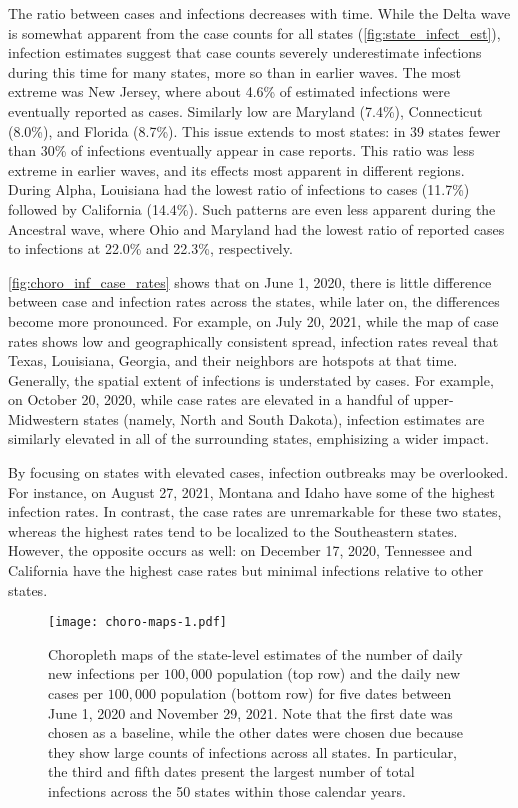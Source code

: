 The ratio between cases and infections decreases with time. While the Delta wave
is somewhat apparent from the case counts for all states
(\autoref{fig:state_infect_est}), infection estimates suggest that case counts
severely underestimate infections during this time for many states, more so than
in earlier waves. The most extreme was New Jersey, where about 4.6\% of
estimated infections were eventually reported as cases. Similarly low are
Maryland (7.4\%), Connecticut (8.0\%), and Florida (8.7\%). This issue extends
to most states: in 39 states fewer than 30\% of infections eventually appear in
case reports. This ratio was less extreme in earlier waves, and its effects most
apparent in different regions. During Alpha, Louisiana had the lowest ratio of
infections to cases (11.7\%) followed by California (14.4\%). Such patterns are
even less apparent during the Ancestral wave, where Ohio and Maryland had the
lowest ratio of reported cases to infections at 22.0\% and 22.3\%,
respectively. 

\autoref{fig:choro_inf_case_rates} shows that on June 1, 2020, there is little
difference between case and infection rates across the states, while later on,
the differences become more pronounced. For example, on July 20, 2021, while the
map of case rates shows low and geographically consistent spread, infection
rates reveal that Texas, Louisiana, Georgia, and their neighbors are hotspots at
that time. Generally, the spatial extent of infections is understated by
cases. For example, on October 20, 2020, while case rates are elevated in a
handful of upper-Midwestern states (namely, North and South Dakota), infection
estimates are similarly elevated in all of the surrounding states, emphisizing a
wider impact.

By focusing on states with elevated cases, infection outbreaks may be
overlooked. For instance, on August 27, 2021, Montana and Idaho have some of the
highest infection rates. In contrast, the case rates are unremarkable for these
two states, whereas the highest rates tend to be localized to the Southeastern
states. However, the opposite occurs as well: on December
17, 2020, Tennessee and California have the highest case rates but minimal
infections relative to other states.

\begin{figure}[!tb]
\centering
\texttt{[image: choro-maps-1.pdf]}
\caption{Choropleth maps of the state-level estimates of the number of daily new
infections per $100,000$ population (top row) and the daily new cases per
$100,000$ population (bottom row) for five dates between June 1, 2020 and
November 29, 2021. Note that the first date was chosen as a baseline, while the
other dates were chosen due because they show large counts of infections across all
states. In particular, the third and fifth dates present the largest number of
total infections across the 50 states within those calendar years.} 
\label{fig:choro_inf_case_rates}
\end{figure}    



